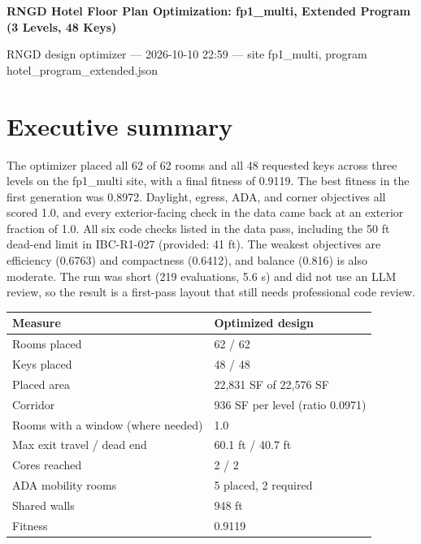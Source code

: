 \documentclass[10pt]{article}
\begin{document}
{\color{bp}\Large\bfseries RNGD Hotel Floor Plan Optimization: fp1\_multi, Extended Program (3 Levels, 48 Keys)}\par
{\small RNGD design optimizer --- 2026-10-10 22:59 --- site fp1\_multi, program hotel\_program\_extended.json}\par
{}

\section{Executive summary}
The optimizer placed all 62 of 62 rooms and all 48 requested keys across three levels on the fp1\_multi site, with a final fitness of 0.9119. The best fitness in the first generation was 0.8972. Daylight, egress, ADA, and corner objectives all scored 1.0, and every exterior-facing check in the data came back at an exterior fraction of 1.0. All six code checks listed in the data pass, including the 50 ft dead-end limit in IBC-R1-027 (provided: 41 ft). The weakest objectives are efficiency (0.6763) and compactness (0.6412), and balance (0.816) is also moderate. The run was short (219 evaluations, 5.6 s) and did not use an LLM review, so the result is a first-pass layout that still needs professional code review.

{\small\begin{longtable}{p{6cm}p{9.5cm}}\toprule
\textbf{Measure} & \textbf{Optimized design} \\ \midrule \endhead
Rooms placed & 62 / 62 \\
Keys placed & 48 / 48 \\
Placed area & 22,831 SF of 22,576 SF \\
Corridor & 936 SF per level (ratio 0.0971) \\
Rooms with a window (where needed) & 1.0 \\
Max exit travel / dead end & 60.1 ft / 40.7 ft \\
Cores reached & 2 / 2 \\
ADA mobility rooms & 5 placed, 2 required \\
Shared walls & 948 ft \\
Fitness & 0.9119 \\
\bottomrule\end{longtable}}
\end{document}
